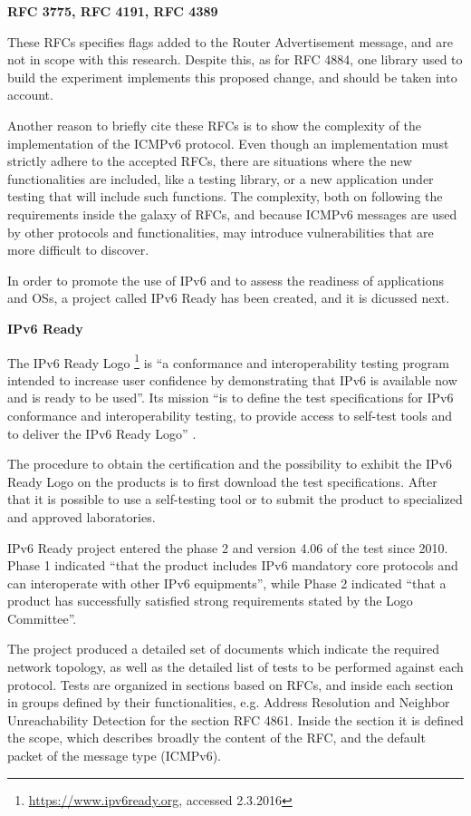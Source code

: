 \documentclass[12pt]{article}
\begin{document}
\textbf{RFC 3775, RFC 4191, RFC 4389}

These RFCs specifies flags added to the Router Advertisement message, and are not in scope with this research. Despite this, as for RFC 4884, one library used to build the experiment implements this proposed change, and should be taken into account.\cite{rfc3775,rfc4191,rfc4389}

Another reason to briefly cite these RFCs is to show the complexity of the implementation of the ICMPv6 protocol. Even though an implementation must strictly adhere to the accepted RFCs, there are situations where the new functionalities are included, like a testing library, or a new application under testing that will include such functions. The complexity, both on following the requirements inside the galaxy of RFCs, and because ICMPv6 messages are used by other protocols and functionalities, may introduce vulnerabilities that are more difficult to discover.

In order to promote the use of IPv6 and to assess the readiness of applications and OSs, a project called IPv6 Ready has been created, and it is dicussed next.

\textbf{IPv6 Ready}
\label{subsub:ipv6Ready}

The IPv6 Ready Logo \footnote{\url{https://www.ipv6ready.org}, accessed 2.3.2016} is ``a conformance and interoperability testing program intended to increase user confidence by demonstrating that IPv6 is available now and is ready to be used''. Its mission ``is to define the test specifications for IPv6 conformance and interoperability testing, to provide access to self-test tools and to deliver the IPv6 Ready Logo'' \cite{ipv6ready}.

The procedure to obtain the certification and the possibility to exhibit the IPv6 Ready Logo on the products is to first download the test specifications. After that it is possible to use a self-testing tool or to submit the product to specialized and approved laboratories.

IPv6 Ready project entered the phase 2 and version 4.06 of the test since 2010. Phase 1 indicated ``that the product includes IPv6 mandatory core protocols and can interoperate with other IPv6 equipments'', while Phase 2 indicated ``that a product has successfully satisfied strong requirements stated by the Logo Committee''.

The project produced a detailed set of documents\cite{ipv6readyCore}\cite{ipv6readyCore2} which indicate the required network topology, as well as the detailed list of tests to be performed against each protocol. Tests are organized in sections based on RFCs, and inside each section in groups defined by their functionalities, e.g. Address Resolution and Neighbor Unreachability Detection for the section RFC 4861. Inside the section it is defined the scope, which describes broadly the content of the RFC, and the default packet of the message type (ICMPv6).
\end{document}
